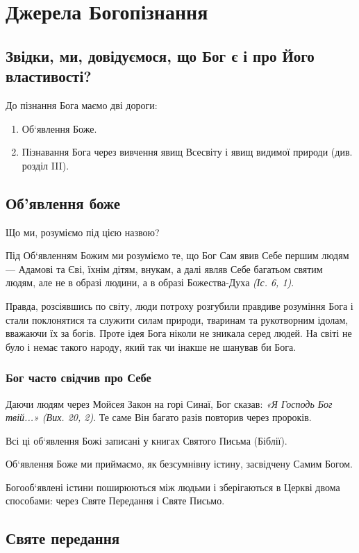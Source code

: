 \documentclass[main.tex]{subfiles}
\begin{document}
\chapter{Джерела Богопізнання}

\section{Звідки, ми, довідуємося, що Бог є і про Його властивості?}

До пізнання Бога маємо дві дороги:
\begin{enumerate}
    \item Об`явлення Боже.
    \item Пізнавання Бога через вивчення явищ Всесвіту і явищ видимої природи (див. розділ III).
\end{enumerate}
\section{Об'явлення боже}
Що ми, розуміємо під цією назвою?

Під Об`явленням Божим ми розуміємо те, що Бог Сам явив Себе першим людям — Адамові та Єві, їхнім дітям, внукам, а далі являв Себе багатьом святим людям, але не в образі людини, а в образі Божества-Духа \emph{(Іс. 6, 1)}.

Правда, розсіявшись по світу, люди потроху розгубили правдиве розуміння Бога і стали поклонятися та служити силам природи, тваринам та рукотворним ідолам, вважаючи їх за богів. Проте ідея Бога ніколи не зникала серед людей. На світі не було і немає такого народу, який так чи інакше не шанував би Бога.
\subsection{Бог часто свідчив про Себе}

Даючи людям через Мойсея Закон на горі Синаї, Бог сказав: \emph{{\color{red} «Я Господь Бог твій...»} (Вих. 20, 2)}. Те саме Він багато разів повторив через пророків.

Всі ці об`явлення Божі записані у книгах Святого Письма (Біблії).

Об`явлення Боже ми приймаємо, як безсумнівну істину, засвідчену Самим Богом.

Богооб`явлені істини поширюються між людьми і зберігаються в Церкві двома способами: через Святе Передання і Святе Письмо.

\section{Святе передання}
\end{document}
